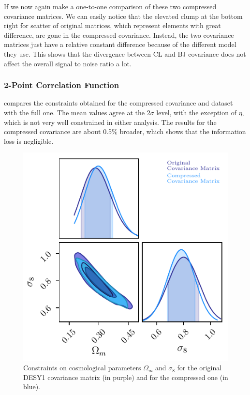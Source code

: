 \documentclass[twocolumn]{\docclass}
\begin{document}
	If we now again make a one-to-one comparison of these two compressed covariance matrices. We can easily notice that the elevated clump at the bottom right for scatter of original matrices, which represent elements with great difference, are gone in the compressed covariance. Instead, the two covariance matrices just have a relative constant difference because of the different model they use. This shows that the divergence between CL and BJ covariance does not affect the overall signal to noise ratio a lot.
	
	\subsubsection{2-Point Correlation Function}
	
	 compares the constraints obtained for the compressed covariance and dataset with the full one. The mean values agree at the $2 \sigma$ level, with the exception of $\eta$, which is not very well constrained in either analysis. The results for the compressed covariance are about 0.5\% broader, which shows that the information loss is negligible. 
	
	\begin{figure}
		\includegraphics[width=0.9\columnwidth]{Compression/CompressionY1_wm-sigma8.pdf}
		\caption{Constraints on cosmological parameters $\Omega_m$ and $\sigma_8$ for the original DESY1 covariance matrix (in purple) and for the compressed one (in blue). \label{fig:compressiony1}}
	\end{figure}
	
\end{document}
